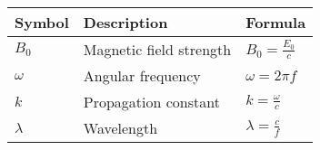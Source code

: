 \setlength{\arrayrulewidth}{0.3mm}
\setlength{\tabcolsep}{15pt}
\renewcommand{\arraystretch}{1.5}

\begin{center}
\begin{tabular}{ |p{1cm}|p{1cm}|p{1.25cm}|  }
\hline

Symbol& Description&Formula\\
\hline
$B_0$ & Magnetic field strength & $B_0 = \frac{E_0}{c}$\\
\hline
$\omega$ & Angular frequency & $\omega = 2\pi f$\\
\hline
$k$ &Propagation constant & $k = \frac{\omega}{c}$\\
\hline
$\lambda$ & Wavelength & $\lambda = \frac{c}{f}$\\
\hline

\end{tabular}
\end{center}